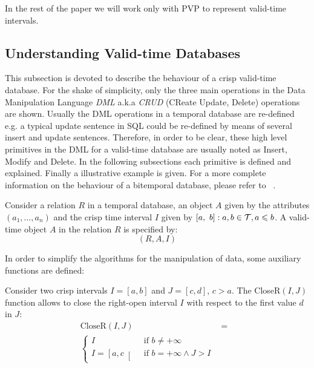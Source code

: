 In the rest of the paper we will work only with PVP to represent valid-time intervals.


\subsection{\label{subsubsec:Understanding-valid-time-databases}Understanding Valid-time Databases}
This subsection is devoted to describe the behaviour of a crisp valid-time database. For the shake of simplicity, only the three main operations in the Data Manipulation Language \emph{DML} a.k.a \emph{CRUD} (CReate Update, Delete) operations are shown. Usually the DML operations in a temporal database are re-defined e.g. a typical update sentence in SQL could be re-defined by means of several insert and update sentences. Therefore, in order to be clear, these high level primitives in the DML for a valid-time database are usually noted as Insert, Modify and Delete. In the following subsections each primitive is defined and explained. Finally a illustrative example is given. For a more complete information on the behaviour of a bitemporal database, please refer to ~\cite{Jensen1994}.

\begin{definition}
Consider a relation $R$ in a temporal database, an object $A$ given by the attributes $\left(a_1, \ldots, a_n \right)$ and the crisp time interval $I$ given by $\left[a,\ b\right] : a,b \in \mathcal{T}, a \leqslant b$. A valid-time object $A$ in the relation $R$ is specified by:
\begin{equation}
\label{eq:rel-def}
\left( R, A , I \right)
\end{equation}
\end{definition}

In order to simplify the algorithms for the manipulation of data, some auxiliary functions are defined:

\begin{definition}
\label{def:close-a-crisp-interval-r}
Consider two crisp intervals $I= \left[a ,b \right]$ and $J= \left[c ,d \right]$, $c > a$. The CloseR$\left(I, J\right)$ function allows to close the right-open interval $I$ with respect to the first value $d$ in $J$:
\begin{align}
\label{eq:close-a-crisp-interval}
\mbox{CloseR} \left( I, J \right) &=& \\ 
\begin{cases}
\nonumber
I & \mbox{ if } b \neq +\infty \\
I=\left[a, c \right[ & \mbox{ if } b = +\infty \wedge J > I
\end{cases}
\end{align}
\end{definition}

